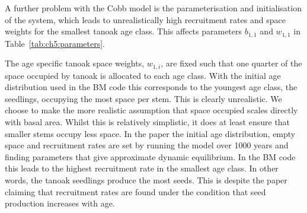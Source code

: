 A further problem with the Cobb model is the parameterisation and initialisation of the system, which leads to unrealistically high recruitment rates and space weights for the smallest tanoak age class. This affects parameters $b_{1,1}$ and $w_{1,1}$ in Table~\ref{tab:ch5:parameters}.

The age specific tanoak space weights, $w_{1,i}$, are fixed such that one quarter of the space occupied by tanoak is allocated to each age class. With the initial age distribution used in the BM code this corresponds to the youngest age class, the seedlings, occupying the most space per stem. This is clearly unrealistic. We choose to make the more realistic assumption that space occupied scales directly with basal area. Whilst this is relatively simplistic, it does at least ensure that smaller stems occupy less space. In the paper the initial age distribution, empty space and recruitment rates are set by running the model over 1000 years and finding parameters that give approximate dynamic equilibrium. In the BM code this leads to the highest recruitment rate in the smallest age class. In other words, the tanoak seedlings produce the most seeds. This is despite the paper claiming that recruitment rates are found under the condition that seed production increases with age.

